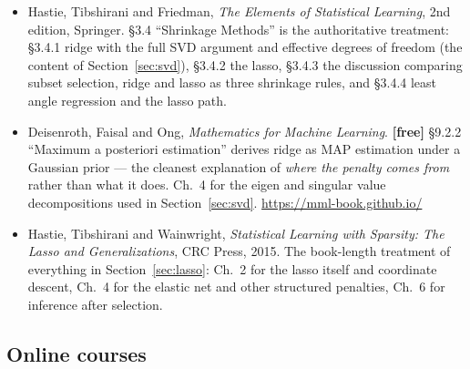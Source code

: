 \documentclass[11pt]{article}
\begin{document}
\begin{itemize}[leftmargin=*]
    \textbf{[free]}:
    \url{https://github.com/amueller/introduction_to_ml_with_python}
  \item Hastie, Tibshirani and Friedman, \emph{The Elements of Statistical
    Learning}, 2nd edition, Springer. \S3.4 ``Shrinkage Methods'' is the
    authoritative treatment: \S3.4.1 ridge with the full SVD argument and
    effective degrees of freedom (the content of Section~\ref{sec:svd}),
    \S3.4.2 the lasso, \S3.4.3 the discussion comparing subset selection,
    ridge and lasso as three shrinkage rules, and \S3.4.4 least angle
    regression and the lasso path.
  \item Deisenroth, Faisal and Ong, \emph{Mathematics for Machine Learning}.
    \textbf{[free]} \S9.2.2 ``Maximum a posteriori estimation'' derives ridge
    as MAP estimation under a Gaussian prior --- the cleanest explanation of
    \emph{where the penalty comes from} rather than what it does. Ch.~4 for
    the eigen and singular value decompositions used in
    Section~\ref{sec:svd}. \url{https://mml-book.github.io/}
  \item Hastie, Tibshirani and Wainwright, \emph{Statistical Learning with
    Sparsity: The Lasso and Generalizations}, CRC Press, 2015. The book-length
    treatment of everything in Section~\ref{sec:lasso}: Ch.~2 for the lasso
    itself and coordinate descent, Ch.~4 for the elastic net and other
    structured penalties, Ch.~6 for inference after selection.
\end{itemize}

\subsection*{Online courses}
\end{document}
